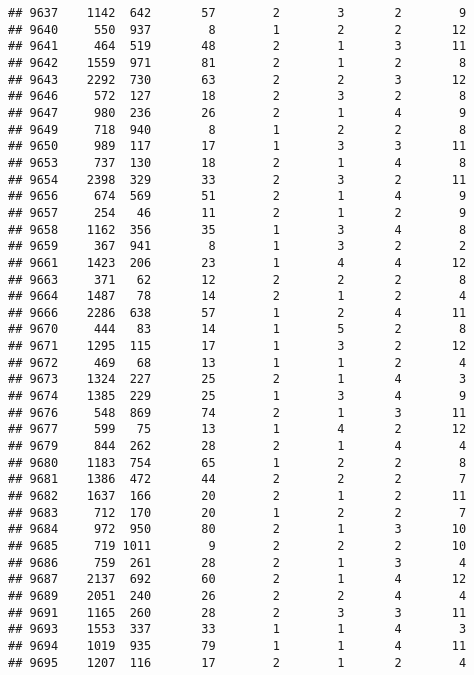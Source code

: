 \documentclass[]{article}
\begin{document}
\begin{verbatim}
## 9637    1142  642       57        2        3       2        9
## 9640     550  937        8        1        2       2       12
## 9641     464  519       48        2        1       3       11
## 9642    1559  971       81        2        1       2        8
## 9643    2292  730       63        2        2       3       12
## 9646     572  127       18        2        3       2        8
## 9647     980  236       26        2        1       4        9
## 9649     718  940        8        1        2       2        8
## 9650     989  117       17        1        3       3       11
## 9653     737  130       18        2        1       4        8
## 9654    2398  329       33        2        3       2       11
## 9656     674  569       51        2        1       4        9
## 9657     254   46       11        2        1       2        9
## 9658    1162  356       35        1        3       4        8
## 9659     367  941        8        1        3       2        2
## 9661    1423  206       23        1        4       4       12
## 9663     371   62       12        2        2       2        8
## 9664    1487   78       14        2        1       2        4
## 9666    2286  638       57        1        2       4       11
## 9670     444   83       14        1        5       2        8
## 9671    1295  115       17        1        3       2       12
## 9672     469   68       13        1        1       2        4
## 9673    1324  227       25        2        1       4        3
## 9674    1385  229       25        1        3       4        9
## 9676     548  869       74        2        1       3       11
## 9677     599   75       13        1        4       2       12
## 9679     844  262       28        2        1       4        4
## 9680    1183  754       65        1        2       2        8
## 9681    1386  472       44        2        2       2        7
## 9682    1637  166       20        2        1       2       11
## 9683     712  170       20        1        2       2        7
## 9684     972  950       80        2        1       3       10
## 9685     719 1011        9        2        2       2       10
## 9686     759  261       28        2        1       3        4
## 9687    2137  692       60        2        1       4       12
## 9689    2051  240       26        2        2       4        4
## 9691    1165  260       28        2        3       3       11
## 9693    1553  337       33        1        1       4        3
## 9694    1019  935       79        1        1       4       11
## 9695    1207  116       17        2        1       2        4

\end{verbatim}
\end{document}
